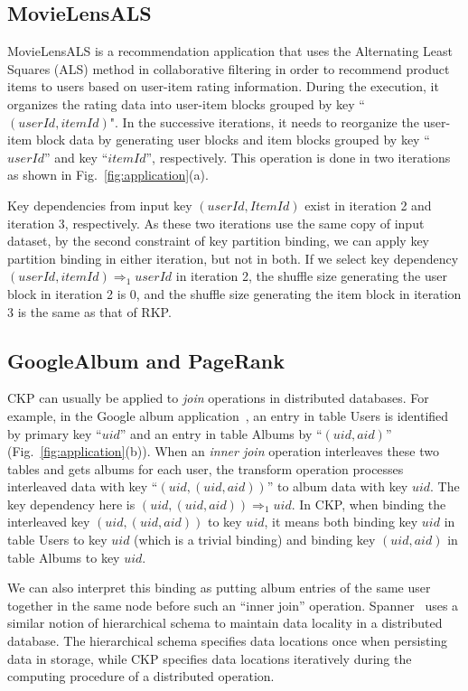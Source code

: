 \documentclass[10pt,journal,compsoc]{IEEEtran}
\begin{document}
\subsection{MovieLensALS}
MovieLensALS \cite{movielensals} is a
recommendation application that uses the Alternating Least Squares (ALS)
method in collaborative filtering in order to recommend product
items to users based on user-item rating information.
During the execution, it organizes the rating data into user-item
blocks grouped by key ``$(userId, itemId)$".
In the successive iterations, it needs to reorganize the user-item block
data by generating user blocks and item blocks grouped by
key ``$userId$'' and key ``$itemId$'', respectively.
This operation is done in two iterations as shown in Fig.~\ref{fig:application}(a). 

Key dependencies from input key $(userId, ItemId)$ exist in
iteration 2 and iteration 3, respectively.
As these two iterations use the same copy of input dataset, 
by the second constraint of key partition binding, 
we can apply key partition binding in either iteration, 
but not in both.
If we select key dependency $(userId, itemId) \Rightarrow_1
userId$ in iteration 2, the shuffle size generating the user block 
in iteration 2 is $0$, 
and the shuffle size generating the item block in iteration 3 
is the same as that of RKP.


\subsection{GoogleAlbum and PageRank}
CKP can usually be applied to \emph{join} operations in distributed databases.
For example, in the Google album application~\cite{google2012spanner}, 
an entry in table Users is identified by primary key ``$uid$''
and an entry in table Albums by ``$(uid, aid)$'' (Fig.~\ref{fig:application}(b)). 
When an \emph{inner join} operation interleaves these two tables and gets albums for 
each user, the transform operation processes interleaved data 
with key ``$(uid, (uid, aid))$'' to album data with key $uid$. 
The key dependency here is $(uid, (uid, aid)) \Rightarrow_{1} uid$.
In CKP, when binding the interleaved key $(uid, (uid, aid))$ to key $uid$, 
it means both binding key $uid$ in table Users to key $uid$ (which is a trivial binding)
and binding key $(uid, aid)$ in table Albums to key $uid$. 

We can also interpret this binding as putting album entries 
of the same user together
in the same node before such an ``inner join'' operation.
Spanner~\cite{google2012spanner} uses a similar notion of 
hierarchical schema to maintain data locality in a distributed database. 
The hierarchical schema specifies data locations once when persisting data in storage, 
while CKP specifies data locations iteratively during the computing procedure of a distributed operation.
\end{document}
